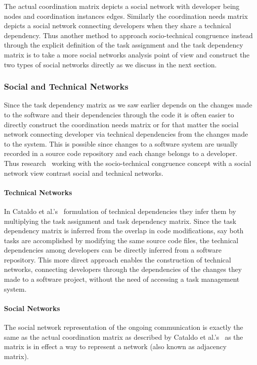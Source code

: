 The actual coordination matrix depicts a social network with developer being nodes and coordination instances edges.
Similarly the coordination needs matrix depicts a social network connecting developers when they share a technical dependency.
Thus another method to approach socio-technical congruence instead through the explicit definition of the task assignment and the task dependency matrix is to take a more social networks analysis point of view and construct the two types of social networks directly as we discuss in the next section.

\subsubsection{Social and Technical Networks}
Since the task dependency matrix as we saw earlier depends on the changes made to the software and their dependencies through the code it is often easier to directly construct the coordination needs matrix or for that matter the social network connecting developer via technical dependencies from the changes made to the system.
This is possible since changes to a software system are usually recorded in a source code repository and each change belongs to a developer.
Thus research~\cite{cataldo:cscw:2006,kwan:tse:2011,valetto:msr:2007,ducheneaut:cscw:2005,ehrlich:stc:2008} working with the socio-technical congruence concept with a social network view contrast social and technical networks.

\paragraph{Technical Networks}
In Cataldo et al.'s~\cite{cataldo:cscw:2006} formulation of technical dependencies they infer them by multiplying the task assignment and task dependency matrix.
Since the task dependency matrix is inferred from the overlap in code modifications, say both tasks are accomplished by modifying the same source code files, the technical dependencies among developers can be directly inferred from a software repository.
This more direct approach enables the construction of technical networks, connecting developers through the dependencies of the changes they made to a software project, without the need of accessing a task management system.

\paragraph{Social Networks}
The social network representation of the ongoing communication is exactly the same as the actual coordination matrix as described by Cataldo et al.'s~\cite{cataldo:cscw:2006} as the matrix is in effect a way to represent a network (also known as adjacency matrix).

